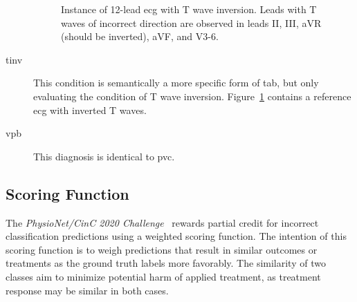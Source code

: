 \documentclass[\main/thesis.tex]{subfiles}
\begin{document}
\begin{description}
    \begin{figure}[H]
        \centering
        \caption{Instance of 12-lead \gls{ecg} with T wave inversion. Leads with T waves of incorrect direction are observed in leads II, III, aVR (should be inverted), aVF, and V3-6.}
        \label{fig:full_TInv}
    \end{figure}
    \item[\gls{tinv}] This condition is semantically a more specific form of \gls{tab}, but only evaluating the condition of T wave inversion.
    Figure~\ref{fig:full_TInv} contains a reference \gls{ecg} with inverted T waves.

    \item[\gls{vpb}] This diagnosis is identical to \gls{pvc}.
\end{description}

\subsection{Scoring Function}
\label{ssec:scoring_function}

The \emph{PhysioNet/CinC 2020 Challenge}~\cite{physionet_challenge_2020} rewards partial credit for incorrect classification predictions using a weighted scoring function.
The intention of this scoring function is to weigh predictions that result in similar outcomes or treatments as the ground truth labels more favorably.
The similarity of two classes aim to minimize potential harm of applied treatment, as treatment response may be similar in both cases.
\end{document}
